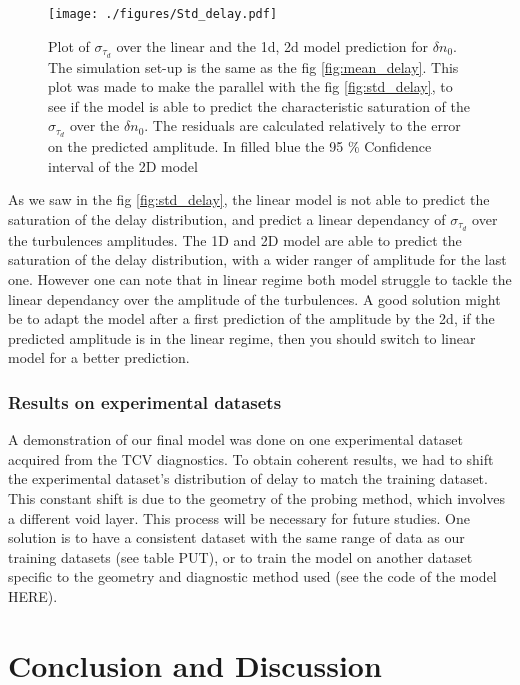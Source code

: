 \documentclass[11pt,a4paper,openany]{report}
\begin{document}
\begin{multicols}{2}
    \begin{figure}[H]
        \centering
        \hspace*{-0.2cm}\texttt{[image: ./figures/Std\_delay.pdf]}
        \label{}
        \caption{Plot of $\sigma_{\tau_d}$ over the linear and the 1d, 2d model prediction for $\delta n_0$. The simulation set-up is the same as the fig \ref{fig:mean_delay}. This plot was made to make the parallel with the fig \ref{fig:std_delay}, to see if the model is able to predict the characteristic saturation of the $\sigma_{\tau_d}$ over the $\delta n_0$. The residuals are calculated relatively to the error on the predicted amplitude. In filled blue the 95 \% Confidence interval of the 2D model}
    \end{figure}

    As we saw in the fig \ref{fig:std_delay}, the linear model is not able to predict the saturation of the delay distribution, and predict a linear dependancy of $\sigma_{\tau_d}$ over the turbulences amplitudes. The 1D and 2D model are able to predict the saturation of the delay distribution, with a wider ranger of amplitude for the last one. However one can note that in linear regime both model struggle to tackle the linear dependancy over the amplitude of the turbulences. A good solution might be to adapt the model after a first prediction of the amplitude by the 2d, if the predicted amplitude is in the linear regime, then you should switch to linear model for a better prediction.

    \subsection{Results on experimental datasets}

    A demonstration of our final model was done on one experimental dataset acquired from the TCV diagnostics. To obtain coherent results, we had to shift the experimental dataset's distribution of delay to match the training dataset. This constant shift is due to the geometry of the probing method, which involves a different void layer. This process will be necessary for future studies. One solution is to have a consistent dataset with the same range of data as our training datasets (see table PUT), or to train the model on another dataset specific to the geometry and diagnostic method used (see the code of the model HERE).

    \chapter{Conclusion and Discussion}


\end{multicols}
\end{document}
